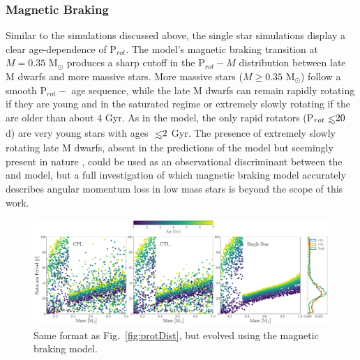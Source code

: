 \documentclass[twocolumn]{aastex61}
\def\lsim{~\rlap{$<$}{\lower 1.0ex\hbox{$\sim$}}}
\begin{document}
\subsubsection{\citet{Reiners2012} Magnetic Braking}

Similar to the \citet{Matt2015} simulations discussed above, the single star simulations display a clear age-dependence of P$_{rot}$. The \citet{Reiners2012} model's magnetic braking transition at $M = 0.35$ M$_{\odot}$ produces a sharp cutoff in the P$_{rot} - M$ distribution between late M dwarfs and more massive stars.  More massive stars ($M \geq 0.35$ M$_{\odot}$) follow a smooth P$_{rot} -$ age sequence, while the late M dwarfs can remain rapidly rotating if they are young and in the saturated regime or extremely slowly rotating if the are older than about 4 Gyr. As in the \citet{Matt2015} model, the only rapid rotators (P$_{rot} \lsim 20$ d) are very young stars with ages $\lsim 2$ Gyr. The presence of extremely slowly rotating late M dwarfs, absent in the predictions of the \citet{Matt2015} model but seemingly present in nature \citep[e.g.][]{Newton2018}, could be used as an observational discriminant between the \citet{Matt2015} and \citet{Reiners2012} model, but a full investigation of which magnetic braking model accurately describes angular momentum loss in low mass stars is beyond the scope of this work. 

\begin{figure}[t]
	\includegraphics[width=\textwidth]{../Plots/protDistReiners.pdf}
   \caption{Same format as Fig.~\ref{fig:protDist}, but evolved using the \citet{Reiners2012} magnetic braking model.}%
    \label{fig:protDistReiners}%
\end{figure}
\end{document}
